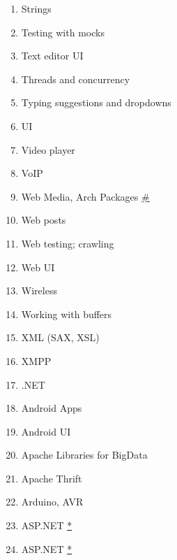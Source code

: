 \documentclass[conference,10pt]{IEEEtran}
\begin{document}
\begin{figure}[H]
\begin{multicols}{2}
\begin{enumerate}
    \item Strings
    \item Testing with mocks
    \item Text editor UI
    \item Threads and concurrency
    \item Typing suggestions and dropdowns
    \item UI
    \item Video player
    \item VoIP
    \item Web Media, Arch Packages \hyperref[dual]{\#}
    \item Web posts
    \item Web testing; crawling
    \item Web UI
    \item Wireless
    \item Working with buffers
    \item XML (SAX, XSL)
    \item XMPP
    \item .NET
    \item Android Apps
    \item Android UI
    \item Apache Libraries for BigData
    \item Apache Thrift
    \item Arduino, AVR
    \item ASP.NET \hyperref[duplicate]{*}
    \item ASP.NET \hyperref[duplicate]{*}
    \setcounter{topics}{\value{enumi}}
 \end{enumerate}
 \end{multicols}
 \end{figure}
\end{document}
